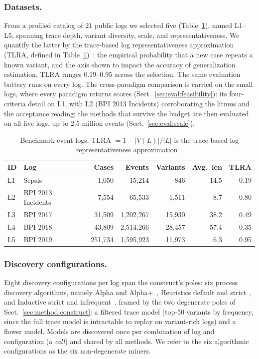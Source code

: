\documentclass[runningheads]{llncs}
\begin{document}
\subsubsection{Datasets.}
From a profiled catalog of $21$ public logs we selected five (Table~\ref{tab:datasets}), named L1--L5, spanning trace depth, variant diversity, scale, and representativeness. We quantify the latter by the trace-based log representativeness approximation (TLRA, defined in Table~\ref{tab:datasets})~\cite{karunaratne2024representativeness}: the empirical probability that a new case repeats a known variant, and the axis shown to impact the accuracy of generalization estimation. TLRA ranges $0.19$--$0.95$ across the selection. The same evaluation battery runs on every log. The cross-paradigm comparison is carried on the small logs, where every paradigm returns scores (Sect.~\ref{sec:eval:feasibility}): its four-criteria detail on L1, with L2 (BPI 2013 Incidents) corroborating the litmus and the acceptance reading; the methods that survive the budget are then evaluated on all five logs, up to $2.5$ million events (Sect.~\ref{sec:eval:scale}).

\begin{table}[t]
\centering
\caption{Benchmark event logs. TLRA $=1-|V(L)|/|L|$ is the trace-based log representativeness approximation~\cite{karunaratne2024representativeness}.}
\label{tab:datasets}
\setlength{\tabcolsep}{3pt}
\footnotesize
\begin{tabular}{@{}llrrrrr@{}}
\toprule
ID & Log & Cases & Events & Variants & Avg.\ len & TLRA \\
\midrule
L1 & Sepsis~\cite{mannhardt2016sepsis} & 1{,}050 & 15{,}214 & 846 & 14.5 & 0.19 \\
L2 & BPI 2013 Incidents~\cite{steeman2013bpi} & 7{,}554 & 65{,}533 & 1{,}511 & 8.7 & 0.80 \\
L3 & BPI 2017~\cite{vandongen2017bpi} & 31{,}509 & 1{,}202{,}267 & 15{,}930 & 38.2 & 0.49 \\
L4 & BPI 2018~\cite{vandongen2018bpi} & 43{,}809 & 2{,}514{,}266 & 28{,}457 & 57.4 & 0.35 \\
L5 & BPI 2019~\cite{vandongen2019bpi} & 251{,}734 & 1{,}595{,}923 & 11{,}973 & 6.3 & 0.95 \\
\bottomrule
\end{tabular}
\end{table}

\subsubsection{Discovery configurations.}
Eight discovery configurations per log span the construct's poles: six process discovery algorithms, namely Alpha and Alpha+~\cite{vanderaalst2004alpha}, Heuristics default and strict~\cite{weijters2006hm}, and Inductive strict and infrequent~\cite{leemans2013im,leemans2014imf}, framed by the two degenerate poles of Sect.~\ref{sec:method:construct}: a filtered trace model (top-50 variants by frequency, since the full trace model is intractable to replay on variant-rich logs) and a flower model. Models are discovered once per combination of log and configuration (a \emph{cell}) and shared by all methods. We refer to the six algorithmic configurations as the six non-degenerate miners.
\end{document}
